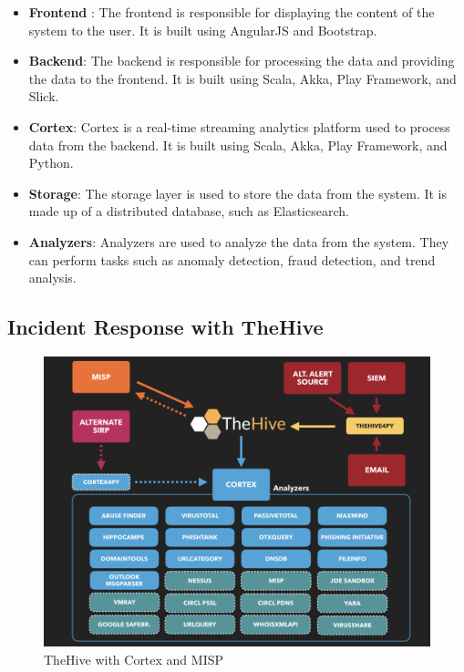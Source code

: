 \documentclass{book}
\begin{document}
\bigskip 
\bigskip

\begin{itemize}
    \item \textbf{Frontend} : The frontend is responsible for displaying the content of the system to the user. It is built using AngularJS and Bootstrap.
    \item \textbf{Backend}: The backend is responsible for processing the data and providing the data to the frontend. It is built using Scala, Akka, Play Framework, and Slick.
    \item \textbf{Cortex}: Cortex is a real-time streaming analytics platform used to process data from the backend. It is built using Scala, Akka, Play Framework, and Python.
    \item \textbf{Storage}: The storage layer is used to store the data from the system. It is made up of a distributed database, such as Elasticsearch.
    \item \textbf{Analyzers}: Analyzers are used to analyze the data from the system. They can perform tasks such as anomaly detection, fraud detection, and trend analysis.
\end{itemize}

\newpage
\subsection{Incident Response with TheHive}
\begin{figure}[h]
    \centering
    \includegraphics[scale=0.5]{Introductory Images/hive and others integration.png}
    \caption{TheHive with Cortex and MISP}
    \label{fig:hivecortexmisp}
\end{figure}
\end{document}

